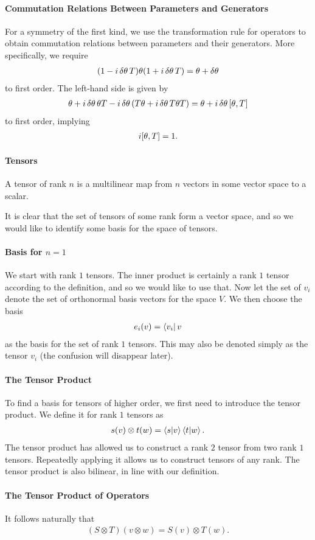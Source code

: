 \paragraph{Commutation Relations Between Parameters and Generators}
For a symmetry of the first kind, we use the transformation rule for operators to obtain commutation relations between parameters and their generators. More specifically, we require
\begin{align*}
	(1 - i\var{\theta}T)\theta(1 + i\var{\theta}T) = \theta + \var{\theta}
\end{align*}
to first order. The left-hand side is given by
\begin{align*}
	\theta + i\var{\theta}\theta T - i\var{\theta}(T\theta + i\var{\theta}T\theta T) = \theta + i\var{\theta}\comm{\theta}{T}
\end{align*}
to first order, implying
\begin{align*}
	i\comm{\theta}{T} = 1.
\end{align*}

\paragraph{Tensors}
A tensor of rank $n$ is a multilinear map from $n$ vectors in some vector space to a scalar.

It is clear that the set of tensors of some rank form a vector space, and so we would like to identify some basis for the space of tensors.

\paragraph{Basis for $n = 1$}
We start with rank $1$ tensors. The inner product is certainly a rank $1$ tensor according to the definition, and so we would like to use that. Now let the set of $v_{i}$ denote the set of orthonormal basis vectors for the space $V$. We then choose the basis
\begin{align*}
	e_{i}(v) = \bra{v_{i}}{v}
\end{align*}
as the basis for the set of rank $1$ tensors. This may also be denoted simply as the tensor $v_{i}$ (the confusion will disappear later).

\paragraph{The Tensor Product}
To find a basis for tensors of higher order, we first need to introduce the tensor product. We define it for rank $1$ tensors as
\begin{align*}
	s(v)\otimes t(w) = \braket{s}{v}\braket{t}{w}.
\end{align*}
The tensor product has allowed us to construct a rank $2$ tensor from two rank $1$ tensors. Repeatedly applying it allows us to construct tensors of any rank. The tensor product is also bilinear, in line with our definition.

\paragraph{The Tensor Product of Operators}
It follows naturally that
\begin{align*}
	(S\otimes T)(v\otimes w) = S(v)\otimes T(w).
\end{align*}